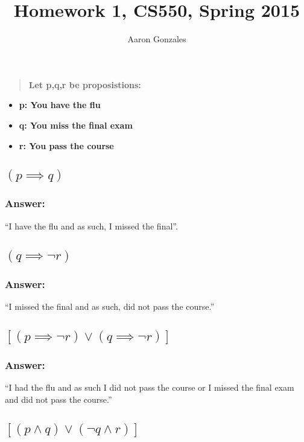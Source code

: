 \documentclass[titlepage]{article}\usepackage[]{graphicx}\usepackage[]{color}
\begin{document}
\title{Homework 1, CS550, Spring 2015}
\author{Aaron Gonzales}
\maketitle


\section{}
\begin{quote}
  \textbf{Let p,q,r be proposistions:}
\end{quote}

\begin{itemize}
  \item \textbf{p: You have the flu}
  \item \textbf{q: You miss the final exam}
  \item \textbf{r: You pass the course}
\end{itemize}

\subsection{ $(p \implies q)$ }
\subsubsection{Answer:}
``I have the flu and as such, I missed the final''.

\subsection{ $(q \implies \lnot r)$ }
\subsubsection{Answer:}
``I missed the final and as such, did not pass the course.''

\subsection{ $[(p \implies \lnot r) \lor (q \implies \lnot r)]$ }
\subsubsection{Answer:}
``I had the flu and as such I did not pass the course or I missed the final exam
and did not pass the course.''

\subsection{ $[(p \land q) \lor ( \lnot q \land r)]$ }
\end{document}
